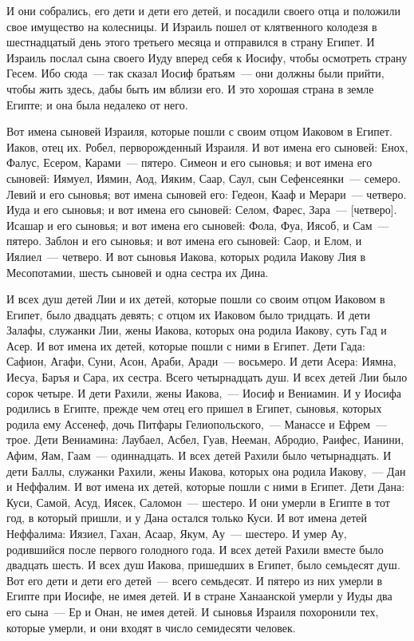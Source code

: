 И они собрались, его дети и дети его детей, и
посадили своего отца и положили свое имущество
на колесницы. И Израиль пошел от клятвенного
колодезя в шестнадцатый день этого третьего
месяца и отправился в страну Египет. И Израиль
послал сына своего Иуду вперед себя к Иосифу,
чтобы осмотреть страну Гесем. Ибо сюда~--- так
сказал Иосиф братьям~--- они должны были прийти,
чтобы жить здесь, дабы быть им вблизи его. И это
хорошая страна в земле Египте; и она была
недалеко от него.

Вот имена сыновей Израиля, которые пошли с
своим отцом Иаковом в Египет. Иаков, отец их.
Робел, перворожденный Израиля. И вот имена его
сыновей: Енох, Фалус, Есером, Карами~--- пятеро.
Симеон и его сыновья; и вот имена его сыновей:
Иямуел, Иямин, Аод, Ияким, Саар, Саул, сын
Сефенсеянки~--- семеро. Левий и его сыновья; вот
имена сыновей его: Гедеон, Кааф и Мерари~--- четверо.
Иуда и его сыновья; и вот имена его сыновей: Селом,
Фарес, Зара~--- [четверо]. Исашар и его сыновья; и
вот имена его сыновей: Фола, Фуа, Иясоб, и Сам~---
пятеро. Заблон и его сыновья; и вот имена его
сыновей: Саор, и Елом, и Иялиел~--- четверо. И вот
сыновья Иакова, которых родила Иакову Лия в
Месопотамии, шесть сыновей и одна сестра их Дина.

И всех душ детей Лии и их детей, которые пошли со
своим отцом Иаковом в Египет, было двадцать
девять; с отцом их Иаковом было тридцать. И дети
Залафы, служанки Лии, жены Иакова, которых она
родила Иакову, суть Гад и Асер. И вот имена их
детей, которые пошли с ними в Египет. Дети Гада:
Сафион, Агафи, Суни, Асон, Араби, Аради~--- восьмеро.
И дети Асера: Иямна, Иесуа, Баръя и Сара, их сестра.
Всего четырнадцать душ. И всех детей Лии было
сорок четыре. И дети Рахили, жены Иакова,~--- Иосиф и
Вениамин. И у Иосифа родились в Египте, прежде чем
отец его пришел в Египет, сыновья, которых родила
ему Ассенеф, дочь Питфары Гелиопольского,~---
Манассе и Ефрем~--- трое. Дети Вениамина: Лаубаел,
Асбел, Гуав, Нееман, Абродио, Раифес, Ианини, Афим,
Яам, Гаам~--- одиннадцать. И всех детей Рахили было
четырнадцать. И дети Баллы, служанки Рахили, жены
Иакова, которых она родила Иакову,~--- Дан и
Неффалим. И вот имена их детей, которые пошли с
ними в Египет. Дети Дана: Куси, Самой, Асуд, Иясек,
Саломон~--- шестеро. И они умерли в Египте в тот год,
в который пришли, и у Дана остался только Куси. И
вот имена детей Неффалима: Иязиел, Гахан, Асаар,
Якум, Ау~--- шестеро. И умер Ау, родившийся после
первого голодного года. И всех детей Рахили
вместе было двадцать шесть. И всех душ Иакова,
пришедших в Египет, было семьдесят душ. Вот его
дети и дети его детей~--- всего семьдесят. И пятеро
из них умерли в Египте при Иосифе, не имея детей. И
в стране Ханаанской умерли у Иуды два его сына~---
Ер и Онан, не имея детей. И сыновья Израиля
похоронили тех, которые умерли, и они входят в
число семидесяти человек.

